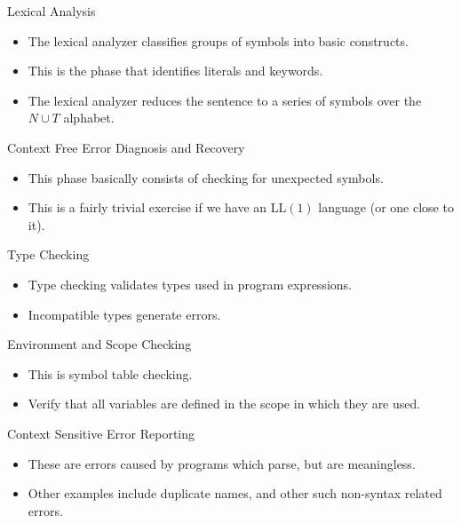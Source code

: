 \documentclass[]{beamer}
\begin{document}
\begin{frame}{Lexical Analysis}
    \begin{itemize}[<+->]
        \item The lexical analyzer classifies groups of symbols into
            basic constructs.
        \item This is the phase that identifies literals and keywords.
        \item The lexical analyzer reduces the sentence to a series of
            symbols over the $N\cup T$ alphabet.
    \end{itemize}
\end{frame}

\begin{frame}{Context Free Error Diagnosis and Recovery}
    \begin{itemize}[<+->]
        \item This phase basically consists of checking for
            unexpected symbols.
        \item This is a fairly trivial exercise if we have an
            $\mathrm{LL}(1)$ language (or one close to it).
    \end{itemize}
\end{frame}

\begin{frame}{Type Checking}
    \begin{itemize}[<+->]
        \item Type checking validates types used in program
            expressions.
        \item Incompatible types generate errors.
    \end{itemize}
\end{frame}

\begin{frame}{Environment and Scope Checking}
    \begin{itemize}[<+->]
        \item This is symbol table checking.
        \item Verify that all variables are defined in the scope in
            which they are used.
    \end{itemize}
\end{frame}

\begin{frame}{Context Sensitive Error Reporting}
    \begin{itemize}[<+->]
        \item These are errors caused by programs which parse, but are
            meaningless.
        \item Other examples include duplicate names, and other such
            non-syntax related errors.
    \end{itemize}
\end{frame}
\end{document}
